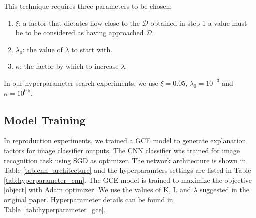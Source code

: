 This technique requires three parameters to be chosen:
\begin{enumerate}
    \item $\xi$: a factor that dictates how close to the $\mathcal{D}$ obtained in step 1 a value must be to be considered as having approached $\mathcal{D}$.
    \item $\lambda_0$: the value of $\lambda$ to start with.
    \item $\kappa$: the factor by which to increase $\lambda$.
\end{enumerate}
In our hyperparameter search experiments, we use $\xi = 0.05$, $\lambda_0 = 10^{-3}$ and $\kappa = 10^{0.5}$.
  
\subsection{Model Training}
In reproduction experiments, we trained a GCE model to generate explanation factors for image classifier outputs. The CNN classifier was trained for image recognition task using SGD as optimizer. The network architecture is shown in Table \ref{tab:cnn_architecture} and the hyperparamters settings are listed in Table \ref{tab:hyperparameter_cnn}. The GCE model is trained to maximize the objective \ref{object} with Adam optimizer. We use the values of K, L and $\lambda$  suggested in the original paper. Hyperparameter details can be found in Table~\ref{tab:hyperparameter_gce}. 



